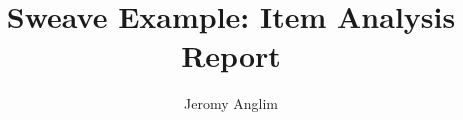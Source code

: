 \documentclass[a4paper]{article}
\begin{document}
\title{Sweave Example: Item Analysis Report}
\author{Jeromy Anglim}

\maketitle
\end{document}
